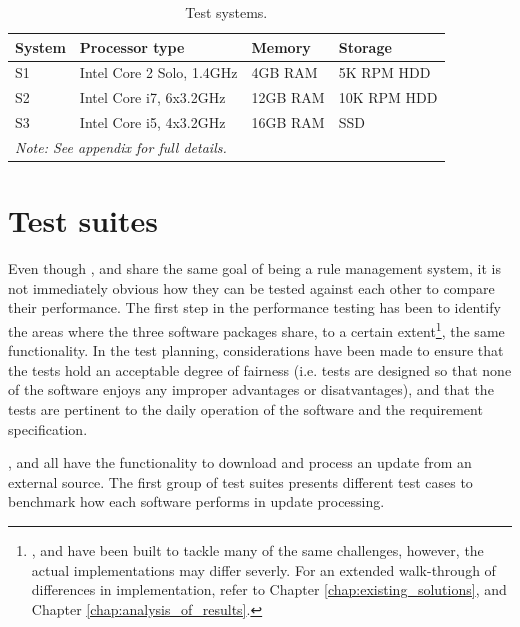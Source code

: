 \renewcommand{\arraystretch}{1.5}

\begin{table}[h!]
  \centering
  \begin{tabular}{l|l|l|l}
	System & Processor type & Memory & Storage \\
	\hline
	S1 & Intel\textregistered{} Core\texttrademark{} 2 Solo, 1.4GHz & 4GB RAM & 5K
	RPM HDD \\
	\hline
	S2 & Intel\textregistered{} Core\texttrademark{} i7, 6x3.2GHz & 12GB RAM & 10K
	RPM HDD \\
	\hline
	S3 & Intel\textregistered{} Core\texttrademark{} i5, 4x3.2GHz & 16GB RAM & SSD
	\\
	\hline
	\multicolumn{4}{l}{\textit{Note: See appendix for full details.}}
  \end{tabular}
  \caption{Test systems.}
  \label{tab:testSystems}
\end{table}

\section{Test suites}
Even though \snowman{}, \bhtb{} and \snortmanager{} share the same goal of being a
rule management system, it is not immediately obvious how they can be tested against
each other to compare their performance. The first step in the performance
testing has been to identify the areas where the three software packages share, to a
certain extent\footnote{\snowman{}, \bhtb{} and \snortmanager{} have been built
to tackle many of the same challenges, however, the actual implementations may
differ severly. For an extended walk-through of differences in implementation,
refer to Chapter \ref{chap:existing_solutions}, and Chapter
\ref{chap:analysis_of_results}.}, the same functionality. In the
test planning, considerations have been made to ensure that the tests hold an
acceptable degree of fairness (i.e. tests are designed so that none of the
software enjoys any improper advantages or disatvantages), and that the tests
are pertinent to the daily operation of the software and the \snowman{}
requirement specification.

\snowman{}, \bhtb{} and \snortmanager{} all have the functionality to download and
process an update from an external source. The first group of test
suites presents different test cases to benchmark how each software performs in
update processing.

